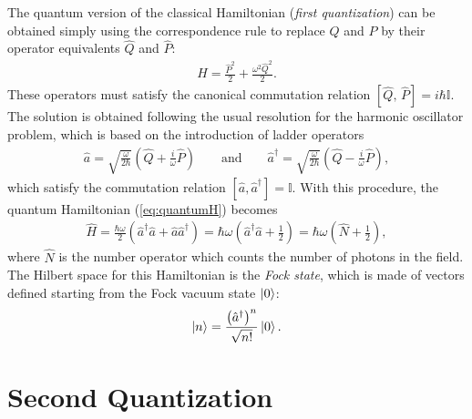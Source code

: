 The quantum version of the classical Hamiltonian (\textit{first quantization}) can be obtained simply using the correspondence rule to replace $Q$ and $P$ by their operator equivalents $\hat{Q}$ and $\hat{P}$: 
\begin{align}
    \hat{H} = \frac{\hat{P}^2}{2} + \frac{\omega^2 \hat{Q}^2}{2}. 
    \label{eq:quantumH}
\end{align}
These operators must satisfy the canonical commutation relation $[\hat{Q},\, \hat{P}] =  i \hbar \mathbb{I}$.
The solution is obtained following the usual resolution for the harmonic oscillator problem, which is based on the introduction of ladder operators
\begin{align*}
    \hat{a} = \sqrt{\frac{\omega}{2 \hbar}} \left( \hat{Q} + \frac{i}{\omega} \hat{P} \right) \qquad \text{and} \qquad \hat{a}^\dagger = \sqrt{\frac{\omega}{2 \hbar}} \left( \hat{Q} - \frac{i}{\omega} \hat{P} \right),
\end{align*}
which satisfy the commutation relation $[\hat{a},\hat{a}^\dagger] = \mathbb{I}$. With this procedure, the quantum Hamiltonian (\ref{eq:quantumH}) becomes 
\begin{align}
    \hat{H} = \frac{\hbar \omega}{2} \left( \hat{a}^\dagger \hat{a} + \hat{a} \hat{a}^\dagger \right) =  \hbar \omega \left( \hat{a}^\dagger \hat{a} + \frac{1}{2}\right) = \hbar \omega \left( \hat{N} + \frac{1}{2}\right), 
    \label{eq:hamHO}
\end{align}
where $\hat{N}$ is the number operator which counts the number of photons in the field.
The Hilbert space for this Hamiltonian is the \textit{Fock state}, which is made of vectors defined starting from the Fock vacuum state $\ket{0}$: 
\begin{align}
    \ket{n} = \frac{\left( \hat{a}^\dagger\right)^n}{\sqrt{n!}} \ket{0}. 
\end{align}





\section{Second Quantization}
\newcommand{\A}{\hat{\vec{A}}}
\newcommand{\dsr}[1]{\hat{a}_{#1}}
\newcommand{\crt}[1]{\hat{a}^{\dagger}_{#1}}
\newcommand{\ur}[1]{\vec{u}_{#1}(\vec{r})}
\newcommand{\urc}[1]{\vec{u}_{#1}^{\ast}(\vec{r})}
\newcommand{\ub}[1]{\vec{u}_{#1}}
\newcommand{\ubc}[1]{\vec{u}_{#1}^{\ast}}
\newcommand{\ux}[3]{\vec{u}(#1, #2, #3)}
\newcommand{\N}{\crt{} \dsr{}}
\newcommand{\dr}{\vec{dr}^{3}}
\newcommand{\pw}{e^{i \vec{k} \cdot \vec{r}}}
\newcommand{\pwc}{e^{-i \vec{k} \cdot \vec{r}}}

